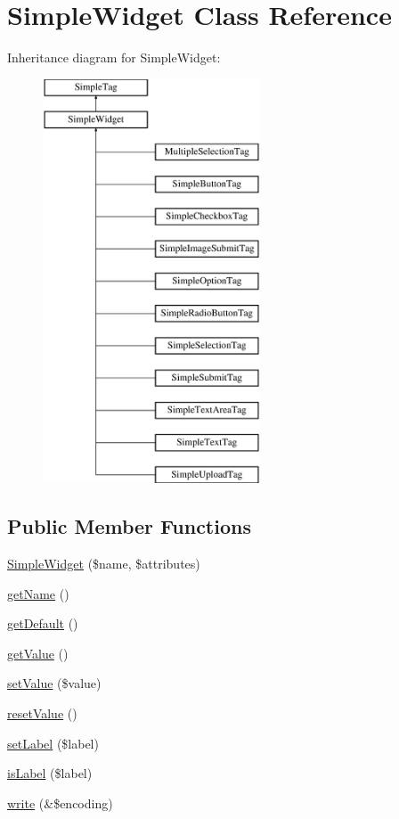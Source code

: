 \hypertarget{class_simple_widget}{
\section{SimpleWidget Class Reference}
\label{class_simple_widget}
}
Inheritance diagram for SimpleWidget:\begin{figure}[H]
\begin{center}
\leavevmode
\includegraphics[height=12.000000cm]{class_simple_widget}
\end{center}
\end{figure}
\subsection*{Public Member Functions}
\begin{DoxyCompactItemize}
\item 
\hyperlink{class_simple_widget_a76a5c48eb5110ad5bb13f683ea4c77bf}{SimpleWidget} (\$name, \$attributes)
\item 
\hyperlink{class_simple_widget_a843805d75f3035c202d169b343005828}{getName} ()
\item 
\hyperlink{class_simple_widget_a9c0702cdfee1237b1599cb920ce14ba6}{getDefault} ()
\item 
\hyperlink{class_simple_widget_a92328cffb96f6966d6a6a07827e65f6d}{getValue} ()
\item 
\hyperlink{class_simple_widget_a9e048a450e2d29a601e672deda9fa869}{setValue} (\$value)
\item 
\hyperlink{class_simple_widget_a30843333201512c78950addd7589516a}{resetValue} ()
\item 
\hyperlink{class_simple_widget_a8e03ad451a0a611ae3d94afcdb67a724}{setLabel} (\$label)
\item 
\hyperlink{class_simple_widget_ab4560f7a1b68df77c3ee34f6bc81dcab}{isLabel} (\$label)
\item 
\hyperlink{class_simple_widget_a5e546ea2ab317409554f80ba2313f7f2}{write} (\&\$encoding)
\end{DoxyCompactItemize}
